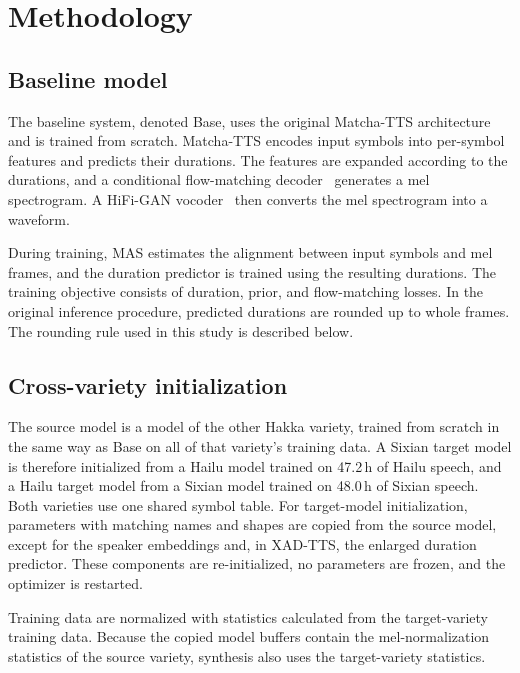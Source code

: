 \documentclass[conference,a4paper]{IEEEtran}
\begin{document}
\section{Methodology}

\subsection{Baseline model}
The baseline system, denoted Base, uses the original Matcha-TTS architecture~\cite{mehta2024matcha} and is trained from scratch. Matcha-TTS encodes input symbols into per-symbol features and predicts their durations. The features are expanded according to the durations, and a conditional flow-matching decoder~\cite{lipman2023flow} generates a mel spectrogram. A HiFi-GAN vocoder~\cite{kong2020hifigan} then converts the mel spectrogram into a waveform.

During training, MAS estimates the alignment between input symbols and mel frames, and the duration predictor is trained using the resulting durations. The training objective consists of duration, prior, and flow-matching losses. In the original inference procedure, predicted durations are rounded up to whole frames. The rounding rule used in this study is described below.

\subsection{Cross-variety initialization}
The source model is a model of the other Hakka variety, trained from scratch in the same way as Base on all of that variety's training data. A Sixian target model is therefore initialized from a Hailu model trained on 47.2\,h of Hailu speech, and a Hailu target model from a Sixian model trained on 48.0\,h of Sixian speech. Both varieties use one shared symbol table. For target-model initialization, parameters with matching names and shapes are copied from the source model, except for the speaker embeddings and, in XAD-TTS, the enlarged duration predictor. These components are re-initialized, no parameters are frozen, and the optimizer is restarted.

Training data are normalized with statistics calculated from the target-variety training data. Because the copied model buffers contain the mel-normalization statistics of the source variety, synthesis also uses the target-variety statistics.
\end{document}
